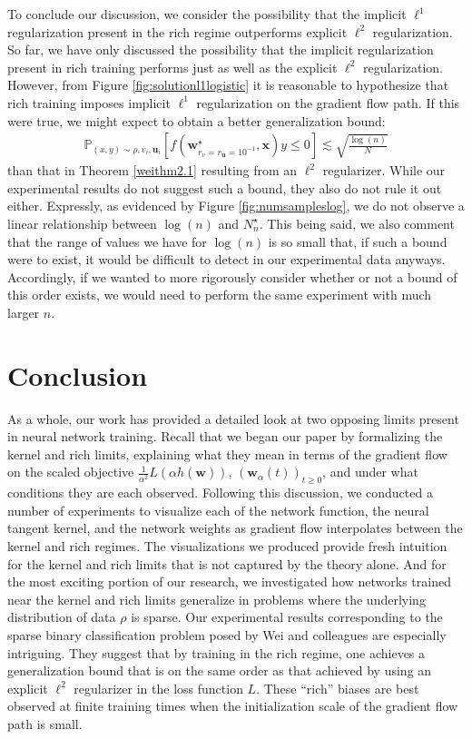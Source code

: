 \documentclass{article}
\begin{document}
To conclude our discussion, we consider the possibility that the implicit $\ell^1$ regularization present in the rich regime outperforms explicit $\ell^2$ regularization. So far, we have only discussed the possibility that the implicit regularization present in rich training performs just as well as the explicit $\ell^2$ regularization. However, from Figure \ref{fig:solutionl1logistic} it is reasonable to hypothesize that rich training imposes implicit $\ell^1$ regularization on the gradient flow path. If this were true, we might expect to obtain a better generalization bound:
\begin{align*}
   \mathbb{P}_{(x,y) \sim \rho, v_i, \boldsymbol{u}_i}[f(\boldsymbol{w}_{r_v = r_{\boldsymbol{u}} = 10^{-1}}^{\star}, \boldsymbol{x})y \leq 0] \lesssim \sqrt{\frac{\log(n)}{N}}
\end{align*}
than that in Theorem \ref{weithm2.1} resulting from an $\ell^2$ regularizer. While our experimental results do not suggest such a bound, they also do not rule it out either. Expressly, as evidenced by Figure \ref{fig:numsampleslog}, we do not observe a linear relationship between $\log(n)$ and $N_n^{\star}$. This being said, we also comment that the range of values we have for $\log(n)$ is so small that, if such a bound were to exist, it would be difficult to detect in our experimental data anyways. Accordingly, if we wanted to more rigorously consider whether or not a bound of this order exists, we would need to perform the same experiment with much larger $n$.

\section{Conclusion}

As a whole, our work has provided a detailed look at two opposing limits present in neural network training. Recall that we began our paper by formalizing the kernel and rich limits, explaining what they mean in terms of the gradient flow on the scaled objective $\frac{1}{\alpha^2}L(\alpha h(\boldsymbol{w}))$, $(\boldsymbol{w}_{\alpha}(t))_{t \geq 0}$, and under what conditions they are each observed. Following this discussion, we conducted a number of experiments to visualize each of the network function, the neural tangent kernel, and the network weights as gradient flow interpolates between the kernel and rich regimes. The visualizations we produced provide fresh intuition for the kernel and rich limits that is not captured by the theory alone. And for the most exciting portion of our research, we investigated how networks trained near the kernel and rich limits generalize in problems where the underlying distribution of data $\rho$ is sparse. Our experimental results corresponding to the sparse binary classification problem posed by Wei and colleagues are especially intriguing. They suggest that by training in the rich regime, one achieves a generalization bound that is on the same order as that achieved by using an explicit $\ell^2$ regularizer in the loss function $L$. These \enquote{rich} biases are best observed at finite training times when the initialization scale of the gradient flow path is small.
\end{document}
